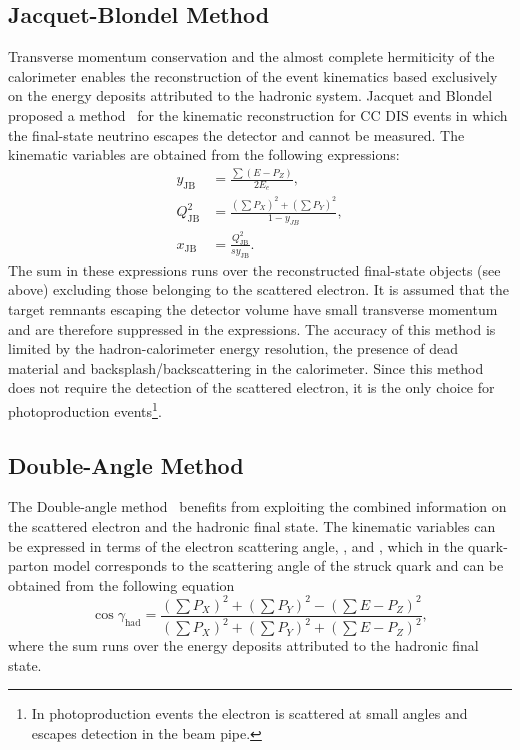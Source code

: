 \subsection{Jacquet-Blondel Method}
\label{subsec:jb}
Transverse momentum conservation and the almost complete hermiticity of the \zeus calorimeter enables the reconstruction of the event kinematics based exclusively on the energy deposits attributed to the hadronic system. Jacquet and Blondel proposed a method~\cite{proc:epfacility:1979:391} for the kinematic reconstruction for CC DIS events in which the final-state neutrino escapes the detector and cannot be measured. The kinematic variables are obtained from the following expressions:
\begin{align}
	y_\text{JB}      &= \frac{\sum{ \left( E - P_{Z} \right) }}{2E_e},			\label{eq:ybj} \\
	Q^2_\text{JB} &= \frac{ \left( \sum{P_{X}} \right)^2 + \left( \sum{P_{Y}} \right)^2 }{1-y_{JB}},			\label{eq:q2jb}							\\
	x_\text{JB}      &= \frac{Q^2_\text{JB}}{s y_\text{JB}}.			\label{eq:xjb}
\end{align}
The sum in these expressions runs over the reconstructed final-state objects (see above) excluding those belonging to the scattered electron. It is assumed that the target remnants escaping the detector volume have small transverse momentum and are therefore suppressed in the expressions. The accuracy of this method is limited by the hadron-calorimeter energy resolution, the presence of dead material and backsplash/backscattering in the calorimeter. Since this method does not require the detection of the scattered electron, it is the only choice for photoproduction events\footnote{In photoproduction events the electron is scattered at small angles and escapes detection in the beam pipe.}.
\subsection{Double-Angle Method}
\label{subsec:da}
The Double-angle method~\cite{proc:hera:1991:23} benefits from exploiting the combined information on the scattered electron and the hadronic final state. The kinematic variables can be expressed in terms of the electron scattering angle, \thetae, and \gamha, which in the quark-parton model corresponds to the scattering angle of the struck quark and can be obtained from the following equation
\begin{equation}
\cos \gamma_{\text{had}} = \frac{ \left( \sum{P_{X}} \right)^2 + \left( \sum{P_{Y}} \right)^2 - (\sum{E - P_{Z}})^2 }{\left( \sum{P_{X}} \right)^2 + \left( \sum{P_{Y}} \right)^2 + (\sum{E - P_{Z}})^2},
\label{eq:cosgam}
\end{equation}
where the sum runs over the energy deposits attributed to the hadronic final state.

